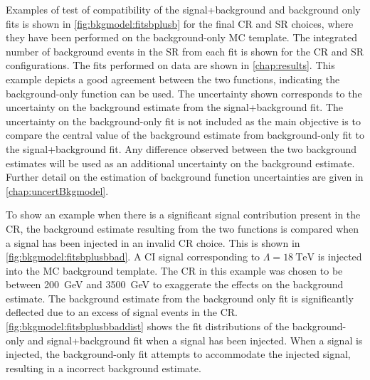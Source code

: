 Examples of test of compatibility of the signal+background and background only fits is shown in \cref{fig:bkgmodel:fitsbplusb} for the final CR and SR choices, where they have been performed on the background-only MC template. The integrated number of background events in the SR from each fit is shown for the CR and SR configurations. The fits performed on data are shown in \cref{chap:results}. This example depicts a good agreement between the two functions, indicating the background-only function can be used. The uncertainty shown corresponds to the uncertainty on the background estimate from the signal+background fit. The uncertainty on the background-only fit is not included as the main objective is to compare the central value of the background estimate from background-only fit to the signal+background fit. Any difference observed between the two background estimates will be used as an additional uncertainty on the background estimate. Further detail on the estimation of background function uncertainties are given in \cref{chap:uncertBkgmodel}. 

To show an example when there is a significant signal contribution present in the CR, the background estimate resulting from the two functions is compared when a signal has been injected in an invalid CR choice. This is shown in \cref{fig:bkgmodel:fitsbplusbbad}. A CI signal corresponding to $\Lambda = \SI{18}{\tera\electronvolt}$ is injected into the MC background template. The CR in this example was chosen to be between \SI{200}{\giga\electronvolt} and \SI{3500}{\giga\electronvolt} to exaggerate the effects on the background estimate. The background estimate from the background only fit is significantly deflected due to an excess of signal events in the CR. \cref{fig:bkgmodel:fitsbplusbbaddist} shows the fit distributions of the background-only and signal+background fit when a signal has been injected. When a signal is injected, the background-only fit attempts to accommodate the injected signal, resulting in a incorrect background estimate. 

